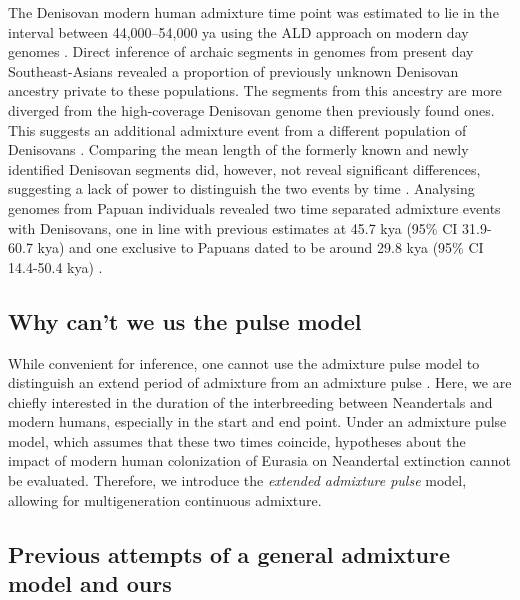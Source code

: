 \documentclass[]{article}
\begin{document}
The Denisovan modern human admixture time point was estimated to lie in the interval between 44,000--54,000 ya using the ALD
approach on modern day genomes \citep{sankararaman_combined_2016}. 
Direct inference of archaic segments in genomes from present day Southeast-Asians revealed a proportion of previously unknown Denisovan ancestry private to these populations. The segments from this ancestry are more diverged from the high-coverage Denisovan genome then previously found ones. This suggests an additional admixture event from a different population of Denisovans \citep{browning_analysis_2018}. 
Comparing the mean length of the formerly known and newly identified Denisovan segments did, however, not reveal significant differences, suggesting a lack of power to distinguish the
two events by time \citep{browning_analysis_2018,jacobs_multiple_2019}. Analysing genomes from Papuan individuals revealed two time separated admixture events with Denisovans, one in line with previous estimates at 45.7 kya (95\% CI 31.9-60.7 kya) and one exclusive to Papuans dated to
be around 29.8 kya (95\% CI 14.4-50.4 kya) \citep{jacobs_multiple_2019}.


\subsection{Why can't we us the pulse model}\label{Why can't we us the pulse model}

While convenient for inference, one cannot use the admixture pulse model to distinguish an extend period of admixture from an admixture pulse \citep{pickrell_toward_2014}. Here, we are chiefly interested in the duration of the interbreeding between Neandertals and modern humans, especially in the start and end point.  Under an admixture pulse model, which assumes that these two times coincide, hypotheses about the impact of modern human colonization of Eurasia on Neandertal extinction cannot be evaluated. Therefore, we introduce the \textit{extended admixture pulse} model, allowing for multigeneration continuous admixture. 

\subsection{Previous attempts of a general admixture model and ours}\label{Previous attempts of a general admixture model and ours}
\end{document}
